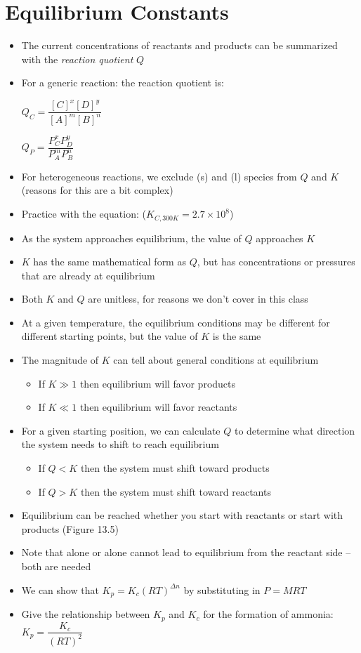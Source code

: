 \documentclass[12pt, openany, letterpaper]{memoir}
\begin{document}
\section{Equilibrium Constants}
\begin{itemize}
  \item The current concentrations of reactants and products can be summarized with the \emph{reaction quotient} $Q$
  \item For a generic reaction:  the reaction quotient is:

    $Q_C=\dfrac{\left[C\right]^x\left[D\right]^y}{\left[A\right]^m\left[B\right]^n}$

    $Q_P=\dfrac{P_C^xP_D^y}{P_A^mP_B^n}$
  \item For heterogeneous reactions, we exclude (s) and (l) species from $Q$ and $K$ (reasons for this are a bit complex)
  \item Practice with the equation:  ($K_{C,300K}=2.7\times10^{8}$)
  \item As the system approaches equilibrium, the value of $Q$ approaches $K$
  \item $K$ has the same mathematical form as $Q$, but has concentrations or pressures that are already at equilibrium
  \item Both $K$ and $Q$ are unitless, for reasons we don't cover in this class
  \item At a given temperature, the equilibrium conditions may be different for different starting points, but the value of $K$ is the same
  \item The magnitude of $K$ can tell about general conditions at equilibrium
	\begin{itemize}
		\item If $K \gg 1$ then equilibrium will favor products
		\item If $K \ll 1$ then equilibrium will favor reactants
	\end{itemize}
  \item For a given starting position, we can calculate $Q$ to determine what direction the system needs to shift to reach equilibrium
    \begin{itemize}
      \item If $Q<K$ then the system must shift toward products
      \item If $Q>K$ then the system must shift toward reactants
    \end{itemize}
	\item Equilibrium can be reached whether you start with reactants or start with products (Figure 13.5)
	\item Note that  alone or  alone cannot lead to equilibrium from the reactant side -- both are needed
  \item We can show that $K_p = K_c\left(RT\right)^{\Delta n}$ by substituting in $P=MRT$
  \item Give the relationship between $K_p$ and $K_c$ for the formation of ammonia: $K_p = \dfrac{K_c}{\left(RT\right)^2}$
\end{itemize}
\end{document}
